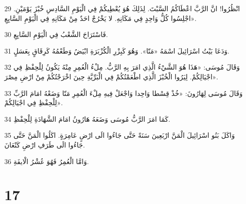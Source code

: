 \par 29 انْظُرُوا! انَّ الرَّبَّ اعْطَاكُمُ السَّبْتَ. لِذَلِكَ هُوَ يُعْطِيكُمْ فِي الْيَوْمِ السَّادِسِ خُبْزَ يَوْمَيْنِ. اجْلِسُوا كُلُّ وَاحِدٍ فِي مَكَانِهِ. لا يَخْرُجْ احَدٌ مِنْ مَكَانِهِ فِي الْيَوْمِ السَّابِعِ».
\par 30 فَاسْتَرَاحَ الشَّعْبُ فِي الْيَوْمِ السَّابِعِ.
\par 31 وَدَعَا بَيْتُ اسْرَائِيلَ اسْمَهُ «مَنّا». وَهُوَ كَبِزْرِ الْكُزْبَرَةِ ابْيَضُ وَطَعْمُهُ كَرِقَاقٍ بِعَسَلٍ.
\par 32 وَقَالَ مُوسَى: «هَذَا هُوَ الشَّيْءُ الَّذِي امَرَ بِهِ الرَّبُّ. مِلْءُ الْعُمِرِ مِنْهُ يَكُونُ لِلْحِفْظِ فِي اجْيَالِكُمْ. لِيَرُوا الْخُبْزَ الَّذِي اطْعَمْتُكُمْ فِي الْبَرِّيَّةِ حِينَ اخْرَجْتُكُمْ مِنْ ارْضِ مِصْرَ».
\par 33 وَقَالَ مُوسَى لِهَارُونَ: «خُذْ قِسْطا وَاحِدا وَاجْعَلْ فِيهِ مِلْءَ الْعُمِرِ مَنّا وَضَعْهُ امَامَ الرَّبِّ لِلْحِفْظِ فِي اجْيَالِكُمْ».
\par 34 كَمَا امَرَ الرَّبُّ مُوسَى وَضَعَهُ هَارُونُ امَامَ الشَّهَادَةِ لِلْحِفْظِ.
\par 35 وَاكَلَ بَنُو اسْرَائِيلَ الْمَنَّ ارْبَعِينَ سَنَةً حَتَّى جَاءُوا الَى ارْضٍ عَامِرَةٍ. اكَلُوا الْمَنَّ حَتَّى جَاءُوا الَى طَرَفِ ارْضِ كَنْعَانَ.
\par 36 وَامَّا الْعُمِرُ فَهُوَ عُشْرُ الْايفَةِ.

\chapter{17}

